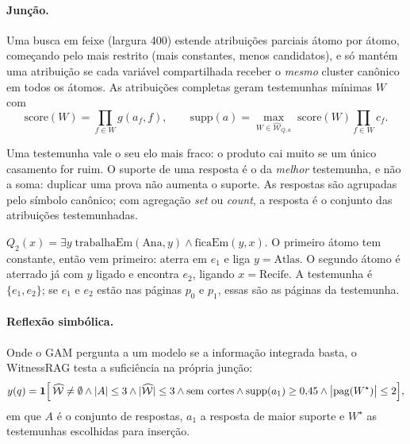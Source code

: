 \documentclass[11pt]{article}
\begin{document}
\paragraph{Junção.}
Uma busca em feixe (largura 400) estende atribuições parciais átomo por
átomo, começando pelo mais restrito (mais constantes, menos candidatos), e só
mantém uma atribuição se cada variável compartilhada receber o \emph{mesmo}
cluster canônico em todos os átomos. As atribuições completas geram
testemunhas mínimas $W$ com
\begin{equation}
\mathrm{score}(W)=\prod_{f\in W}g(a_f,f),
\qquad
\mathrm{supp}(a)=\max_{W\in\widehat{\mathcal{W}}_{Q,a}}\;
  \mathrm{score}(W)\prod_{f\in W}c_f .
\label{eq:suporte}
\end{equation}

\begin{empalavras}
Uma testemunha vale o seu elo mais fraco: o produto cai muito se um único
casamento for ruim. O suporte de uma resposta é o da \emph{melhor}
testemunha, e não a soma: duplicar uma prova não aumenta o suporte. As
respostas são agrupadas pelo símbolo canônico; com agregação \emph{set} ou
\emph{count}, a resposta é o conjunto das atribuições testemunhadas.
\end{empalavras}

\begin{exemplo}
$Q_2(x)=\exists y\;\mathrm{trabalhaEm}(\text{Ana},y)\wedge\mathrm{ficaEm}(y,x)$.
O primeiro átomo tem constante, então vem primeiro: aterra em $e_1$ e liga
$y=\text{Atlas}$. O segundo átomo é aterrado já com $y$ ligado e encontra
$e_2$, ligando $x=\text{Recife}$. A testemunha é $\{e_1,e_2\}$; se $e_1$ e
$e_2$ estão nas páginas $p_0$ e $p_1$, essas são as páginas da testemunha.
\end{exemplo}

\paragraph{Reflexão simbólica.}
Onde o GAM pergunta a um modelo se a informação integrada basta, o WitnessRAG
testa a suficiência na própria junção:
\begin{equation}
  y(q)=\mathbf{1}\Bigl[\,\widehat{\mathcal{W}}\neq\emptyset
  \wedge |A|\le 3 \wedge |\widehat{\mathcal{W}}|\le 3
  \wedge \text{sem cortes}
  \wedge \mathrm{supp}(a_1)\ge 0{,}45
  \wedge \bigl|\mathrm{pag}(W^\star)\bigr|\le 2\Bigr],
  \label{eq:reflexao}
\end{equation}
em que $A$ é o conjunto de respostas, $a_1$ a resposta de maior suporte e
$W^\star$ as testemunhas escolhidas para inserção.
\end{document}

